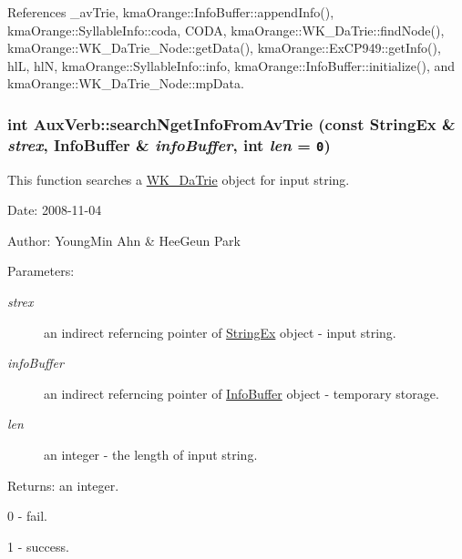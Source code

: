 References \_\-avTrie, kmaOrange::InfoBuffer::appendInfo(), kmaOrange::SyllableInfo::coda, CODA, kmaOrange::WK\_\-DaTrie::findNode(), kmaOrange::WK\_\-DaTrie\_\-Node::getData(), kmaOrange::ExCP949::getInfo(), hlL, hlN, kmaOrange::SyllableInfo::info, kmaOrange::InfoBuffer::initialize(), and kmaOrange::WK\_\-DaTrie\_\-Node::mpData.\hypertarget{classkmaOrange_1_1AuxVerb_683102149981c86b57cf5331a89f05b9}{
\subsubsection[{searchNgetInfoFromAvTrie}]{\setlength{\rightskip}{0pt plus 5cm}int AuxVerb::searchNgetInfoFromAvTrie (const {\bf StringEx} \& {\em strex}, \/  {\bf InfoBuffer} \& {\em infoBuffer}, \/  int {\em len} = {\tt 0})}}
\label{classkmaOrange_1_1AuxVerb_683102149981c86b57cf5331a89f05b9}


This function searches a \hyperlink{classkmaOrange_1_1WK__DaTrie}{WK\_\-DaTrie} object for input string. 

\begin{Desc}
\item[Date:]2008-11-04 \end{Desc}
\begin{Desc}
\item[Author:]YoungMin Ahn \& HeeGeun Park \end{Desc}
\begin{Desc}
\item[Parameters:]
\begin{description}
\item[{\em strex}]an indirect referncing pointer of \hyperlink{classStringEx}{StringEx} object - input string. \item[{\em infoBuffer}]an indirect referncing pointer of \hyperlink{classkmaOrange_1_1InfoBuffer}{InfoBuffer} object - temporary storage. \item[{\em len}]an integer - the length of input string. \end{description}
\end{Desc}
\begin{Desc}
\item[Returns:]an integer.\par
 0 - fail.\par
 1 - success. \end{Desc}


